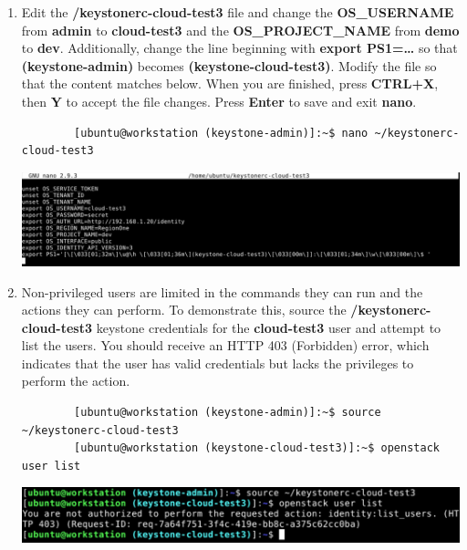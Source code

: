 \documentclass[letterpaper, 12pt]{article}
\begin{document}
\begin{enumerate}
    \item Edit the \textbf{\texttildemid/keystonerc-cloud-test3} file and change the \textbf{OS\_USERNAME} from \textbf{admin} to \textbf{cloud-test3} and the \textbf{OS\_PROJECT\_NAME} from \textbf{demo} to \textbf{dev}.
    Additionally, change the line beginning with \textbf{export PS1=…} so that \textbf{(keystone-admin)} becomes \textbf{(keystone-cloud-test3)}.
    Modify the file so that the content matches below.
    When you are finished, press \textbf{CTRL+X}, then \textbf{Y} to accept the file changes.
    Press \textbf{Enter} to save and exit \textbf{nano}.
    \label{it:edit_keystone}
    \begin{lstlisting}
        [ubuntu@workstation (keystone-admin)]:~$ nano ~/keystonerc-cloud-test3
    \end{lstlisting}

    \begin{center}
        \includegraphics[width=\linewidth]{images/part4/step12.png}
    \end{center}

    \item Non-privileged users are limited in the commands they can run and the actions they can perform.
    To demonstrate this, source the \textbf{\texttildemid/keystonerc-cloud-test3} keystone credentials for the \textbf{cloud-test3} user and attempt to list the users.
    You should receive an HTTP 403 (Forbidden) error, which indicates that the user has valid credentials but lacks the privileges to perform the action.
    \begin{lstlisting}
        [ubuntu@workstation (keystone-admin)]:~$ source ~/keystonerc-cloud-test3
        [ubuntu@workstation (keystone-cloud-test3)]:~$ openstack user list
    \end{lstlisting}

    \begin{center}
        \includegraphics[width=\linewidth]{images/part4/step13.png}
    \end{center}


\end{enumerate}
\end{document}
